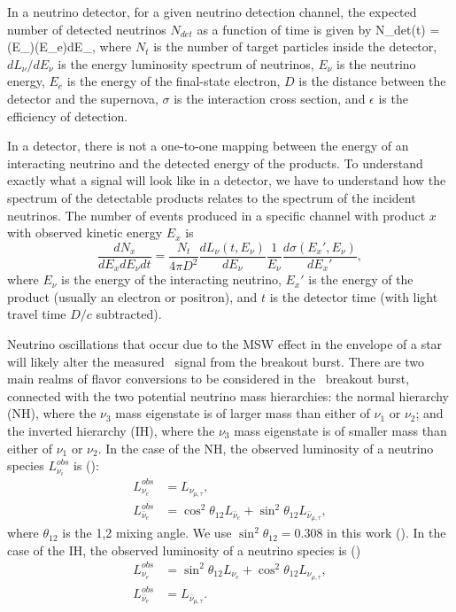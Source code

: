 In a neutrino detector, for a given neutrino detection channel, the
expected number of detected neutrinos $N_{det}$ as a function of time is given by
\beq
\label{eq:Nint}
N_{det}(t) =   \int {}\sigma(E_\nu)\epsilon(E_e)dE_\nu,
\eeq
where $N_t$ is the number of target particles inside the
detector, $dL_\nu/dE_\nu$
is the energy luminosity spectrum of neutrinos, $E_\nu$ is the
neutrino energy, $E_e$ is the energy of the final-state electron, 
$D$ is the distance between the detector and the supernova, 
$\sigma$ is the interaction cross section, and $\epsilon$ is
the efficiency of detection.

In a detector, there is not a one-to-one mapping between the energy
of an interacting neutrino and the detected energy of the products.
To understand exactly what
a signal will look like in a detector, we have to understand how the
spectrum of the detectable products relates to the spectrum of the
incident neutrinos.  The number of events produced in a specific
channel with product $x$ with observed kinetic energy $E_x$
is
\begin{equation}
\frac{dN_x}{dE_x dE_\nu dt} = \frac{N_t}{4\pi D^2} 
\frac{dL_\nu(t,E_\nu)}{dE_\nu}\frac{1}{E_\nu} \frac{d\sigma
(E_{x}',E_\nu)}{dE_{x}'}, %
\end{equation}
where $E_\nu$ is the energy of the interacting neutrino, $E_x'$ is
the energy of the product (usually an electron or positron),
and $t$ is the detector time (with light
travel time $D/c$ subtracted).  

Neutrino oscillations that occur due to the MSW effect 
in the envelope
of a star will likely alter the measured \nue\ signal from the
breakout burst.  There are two main realms of flavor conversions to be
considered in the \nue\ breakout burst, connected with the two
potential neutrino mass hierarchies: the normal hierarchy (NH), 
where the $\nu_3$ mass
eigenstate is of larger mass than either of $\nu_1$ or $\nu_2$; and
the inverted hierarchy (IH), where the $\nu_3$ mass
eigenstate is of smaller mass than either of $\nu_1$ or $\nu_2$. In
the case of the NH, the observed luminosity of a neutrino species
$L^{obs}_{\nu_i}$ is (\citealt{mirizzietal2015}):
\begin{align}
L^{obs}_{\nu_e} &= L_{\nu_{\mu,\tau}}, \\
L^{obs}_{\bar \nu_e} &= \cos^2{\theta_{12}}L_{\bar \nu_e}
+ \sin^2{\theta_{12}}L_{\bar \nu_{\mu,\tau}},
\end{align}
where $\theta_{12}$ is the 1,2 mixing angle.  We use
$\sin^2{\theta_{12}} = 0.308$ in this work (\citealt{oliveetal2014}).
In the case of the IH, the observed luminosity of a neutrino species
is (\citealt{mirizzietal2015})
\begin{align}
L^{obs}_{\nu_e} &= \sin^2{\theta_{12}}L_{\nu_e}
+ \cos^2{\theta_{12}}L_{\nu_{\mu,\tau}}, \\
L^{obs}_{\bar \nu_e} &= L_{\bar \nu_{\mu,\tau}}. \label{eq:anue_ih}
\end{align}



